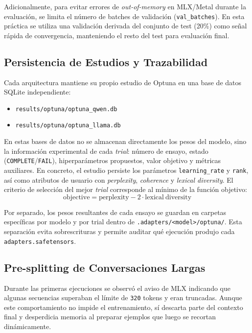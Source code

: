 Adicionalmente, para evitar errores de \textit{out-of-memory} en MLX/Metal durante la evaluación, se limita el número de batches de validación (\texttt{val\_batches}). En esta práctica se utiliza una validación derivada del conjunto de test (20\%) como señal rápida de convergencia, manteniendo el resto del test para evaluación final.

\subsection{Persistencia de Estudios y Trazabilidad}

Cada arquitectura mantiene su propio estudio de Optuna en una base de datos SQLite independiente:
\begin{itemize}
    \item \texttt{results/optuna/optuna\_qwen.db}
    \item \texttt{results/optuna/optuna\_llama.db}
\end{itemize}

En estas bases de datos no se almacenan directamente los pesos del modelo, sino la información experimental de cada \textit{trial}: número de ensayo, estado (\texttt{COMPLETE}/\texttt{FAIL}), hiperparámetros propuestos, valor objetivo y métricas auxiliares. En concreto, el estudio persiste los parámetros \texttt{learning\_rate} y \texttt{rank}, así como atributos de usuario con \textit{perplexity}, \textit{coherence} y \textit{lexical diversity}. El criterio de selección del mejor \textit{trial} corresponde al mínimo de la función objetivo:
\[
\mathrm{objective} = \mathrm{perplexity} - 2 \cdot \mathrm{lexical\ diversity}
\]

Por separado, los pesos resultantes de cada ensayo se guardan en carpetas específicas por modelo y por trial dentro de \texttt{.adapters/<model>/optuna/}. Esta separación evita sobrescrituras y permite auditar qué ejecución produjo cada \texttt{adapters.safetensors}.

\subsection{Pre-splitting de Conversaciones Largas}

Durante las primeras ejecuciones se observó el aviso de MLX indicando que algunas secuencias superaban el límite de \texttt{320} tokens y eran truncadas. Aunque este comportamiento no impide el entrenamiento, sí descarta parte del contexto final y desperdicia memoria al preparar ejemplos que luego se recortan dinámicamente.

